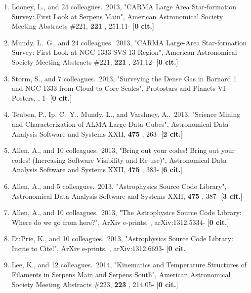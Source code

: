 \documentclass[11pt,letterpaper]{article}
\begin{document}
\begin{enumerate}[resume,label=\textbf{\arabic*}.]
\item  
Looney, L., and 24 colleagues.\  2013,  "CARMA Large Area Star-formation 
Survey: First Look at Serpens Main", American Astronomical Society Meeting 
Abstracts \#221,  {\bf 221} , 251.11- [{\bf 0 cit.}] 

\item  
Mundy, L.~G., and 24 colleagues.\  2013,  "CARMA Large-Area Star-formation 
Survey: First Look at NGC 1333 SVS-13 Region", American Astronomical 
Society Meeting Abstracts \#221,  {\bf 221} , 251.12- [{\bf 0 cit.}] 

\item  
Storm, S., and 7 colleagues.\  2013,  "Surveying the Dense Gas in Barnard 1 
and NGC 1333 from Cloud to Core Scales", Protostars and Planets VI Posters,  
, 1- [{\bf 0 cit.}] 

\item  
Teuben, P., Ip, C.~Y., Mundy, L., and Varshney, A..\  2013,  "Science 
Mining and Characterization of ALMA Large Data Cubes", Astronomical Data 
Analysis Software and Systems XXII,  {\bf 475} , 263- [{\bf 2 cit.}] 

\item  
Allen, A., and 10 colleagues.\  2013,  "Bring out your codes! Bring out 
your codes! (Increasing Software Visibility and Re-use)", Astronomical Data 
Analysis Software and Systems XXII,  {\bf 475} , 383- [{\bf 6 cit.}] 

\item  
Allen, A., and 5 colleagues.\  2013,  "Astrophysics Source Code Library", 
Astronomical Data Analysis Software and Systems XXII,  {\bf 475} , 387- 
[{\bf 3 cit.}] 

\item  
Allen, A., and 10 colleagues.\  2013,  "The Astrophysics Source Code 
Library: Where do we go from here?", ArXiv e-prints,  , arXiv:1312.5334- 
[{\bf 0 cit.}] 

\item  
DuPrie, K., and 10 colleagues.\  2013,  "Astrophysics Source Code Library: 
Incite to Cite!", ArXiv e-prints,  , arXiv:1312.6693- [{\bf 0 cit.}] 

\item  
Lee, K., and 12 colleagues.\  2014,  "Kinematics and Temperature Structures 
of Filaments in Serpens Main and Serpens South", American Astronomical 
Society Meeting Abstracts \#223,  {\bf 223} , 214.05- [{\bf 0 cit.}] 


\end{enumerate}
\end{document}
